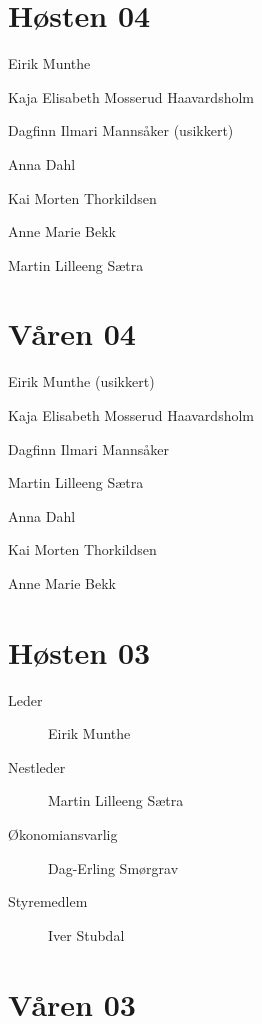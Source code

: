 \section*{Høsten 04}

\begin{description}
	\item[Leder] Eirik Munthe
	\item Kaja Elisabeth Mosserud Haavardsholm
	\item Dagfinn Ilmari Mannsåker (usikkert)
	\item Anna Dahl
	\item Kai Morten Thorkildsen
	\item Anne Marie Bekk
	\item Martin Lilleeng Sætra
\end{description}

\section*{Våren 04}

\begin{description}
	\item[Leder] Eirik Munthe (usikkert)
	\item Kaja Elisabeth Mosserud Haavardsholm
	\item Dagfinn Ilmari Mannsåker
	\item Martin Lilleeng Sætra
	\item Anna Dahl
	\item Kai Morten Thorkildsen
	\item Anne Marie Bekk
\end{description}

\section*{Høsten 03}

\begin{description}
	\item[Leder] Eirik Munthe
	\item[Nestleder] Martin Lilleeng Sætra
	\item[Økonomiansvarlig] Dag-Erling Smørgrav
	\item[Styremedlem] Iver Stubdal
\end{description}

\section*{Våren 03}

